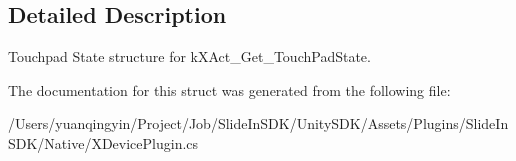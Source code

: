 \subsection{Detailed Description}
Touchpad State structure for k\+X\+Act\+\_\+\+Get\+\_\+\+Touch\+Pad\+State. 

The documentation for this struct was generated from the following file\+:\begin{DoxyCompactItemize}
\item 
/\+Users/yuanqingyin/\+Project/\+Job/\+Slide\+In\+S\+D\+K/\+Unity\+S\+D\+K/\+Assets/\+Plugins/\+Slide\+In\+S\+D\+K/\+Native/X\+Device\+Plugin.\+cs\end{DoxyCompactItemize}
